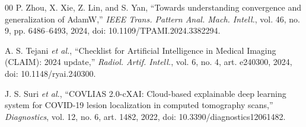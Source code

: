\documentclass[conference]{IEEEtran}
\begin{document}
\begin{thebibliography}{00}
 P. Zhou, X. Xie, Z. Lin, and S. Yan, ``Towards understanding convergence and generalization of AdamW,'' \textit{IEEE Trans. Pattern Anal. Mach. Intell.}, vol. 46, no. 9, pp. 6486--6493, 2024, doi: 10.1109/TPAMI.2024.3382294.

 A. S. Tejani \emph{et al.}, ``Checklist for Artificial Intelligence in Medical Imaging (CLAIM): 2024 update,'' \textit{Radiol. Artif. Intell.}, vol. 6, no. 4, art. e240300, 2024, doi: 10.1148/ryai.240300.

 J. S. Suri \emph{et al.}, ``COVLIAS 2.0-cXAI: Cloud-based explainable deep learning system for COVID-19 lesion localization in computed tomography scans,'' \textit{Diagnostics}, vol. 12, no. 6, art. 1482, 2022, doi: 10.3390/diagnostics12061482.

\end{thebibliography}
\end{document}
